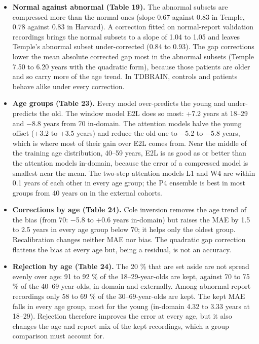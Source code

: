 \documentclass[11pt,a4paper]{article}
\begin{document}
\begin{itemize}
\item \textbf{Normal against abnormal (Table 19).} The abnormal subsets are compressed more than the normal ones (slope 0.67 against 0.83 in Temple, 0.78 against 0.83 in Harvard). A correction fitted on normal-report validation recordings brings the normal subsets to a slope of 1.04 to 1.05 and leaves Temple's abnormal subset under-corrected (0.84 to 0.93). The gap corrections lower the mean absolute corrected gap most in the abnormal subsets (Temple 7.50 to 6.20 years with the quadratic form), because those patients are older and so carry more of the age trend. In TDBRAIN, controls and patients behave alike under every correction.
\item \textbf{Age groups (Table 23).} Every model over-predicts the young and under-predicts the old. The window model E2L does so most: +7.2 years at 18--29 and $-$8.8 years from 70 in-domain. The attention models halve the young offset (+3.2 to +3.5 years) and reduce the old one to $-$5.2 to $-$5.8 years, which is where most of their gain over E2L comes from. Near the middle of the training age distribution, 40--59 years, E2L is as good as or better than the attention models in-domain, because the error of a compressed model is smallest near the mean. The two-step attention models L1 and W4 are within 0.1 years of each other in every age group; the P4 ensemble is best in most groups from 40 years on in the external cohorts.
\item \textbf{Corrections by age (Table 24).} Cole inversion removes the age trend of the bias (from 70: $-$5.8 to +0.6 years in-domain) but raises the MAE by 1.5 to 2.5 years in every age group below 70; it helps only the oldest group. Recalibration changes neither MAE nor bias. The quadratic gap correction flattens the bias at every age but, being a residual, is not an accuracy.
\item \textbf{Rejection by age (Table 24).} The 20 \% that are set aside are not spread evenly over age: 91 to 92 \% of the 18--29-year-olds are kept, against 70 to 75 \% of the 40--69-year-olds, in-domain and externally. Among abnormal-report recordings only 58 to 69 \% of the 30--69-year-olds are kept. The kept MAE falls in every age group, most for the young (in-domain 4.32 to 3.33 years at 18--29). Rejection therefore improves the error at every age, but it also changes the age and report mix of the kept recordings, which a group comparison must account for.
\end{itemize}
\end{document}
